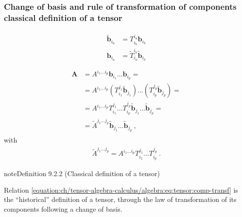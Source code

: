 \documentclass[letterpaper,10pt,english]{jupyterBook}
\begin{document}
\subsubsection{Change of basis and rule of transformation of components \sphinxhyphen{} classical definition of a tensor}
\label{\detokenize{ch/tensor-algebra-calculus/algebra:change-of-basis-and-rule-of-transformation-of-components-classical-definition-of-a-tensor}}\begin{equation*}
\begin{split}\begin{aligned}
  \widetilde{\mathbf{b}}_{i_a} & = T_{i_b}^{i_a} \mathbf{b}_{i_b} \\
             \mathbf{b }_{i_a} & = \widetilde{T}_{i_a}^{i_b} \widetilde{\mathbf{b}}_{i_b} \\
\end{aligned}\end{split}
\end{equation*}\begin{equation*}
\begin{split}\begin{aligned}
  \mathbf{A}
  & = A^{i_1 \dots i_p} \mathbf{b}_{i_1} \dots \mathbf{b}_{i_p} = \\
  & = A^{i_1 \dots i_p} \left( T_{i_1}^{j_1} \widetilde{\mathbf{b}}_{j_1} \right) \dots \left( T_{i_p}^{j_p} \widetilde{\mathbf{b}}_{j_p} \right) = \\
  & = A^{i_1 \dots i_p} T_{i_1}^{j_1} \dots  T_{i_p}^{j_p} \widetilde{\mathbf{b}}_{j_1} \dots \widetilde{\mathbf{b}}_{j_p} = \\
  & = \widetilde{A}^{j_1 \dots j_p} \widetilde{\mathbf{b}}_{j_1} \dots \widetilde{\mathbf{b}}_{j_p} \ ,
\end{aligned}\end{split}
\end{equation*}
\sphinxAtStartPar
with
\begin{equation}\label{equation:ch/tensor-algebra-calculus/algebra:eq:tensor:comp-transf}
\begin{split}\widetilde{A}^{j_1 \dots j_p} = A^{i_1 \dots i_p} T_{i_1}^{j_1} \dots  T_{i_p}^{j_p} \ .\end{split}
\end{equation}\label{ch/tensor-algebra-calculus/algebra:definition-8}
\begin{sphinxadmonition}{note}{Definition 9.2.2 (Classical definition of a tensor)}



\sphinxAtStartPar
Relation \eqref{equation:ch/tensor-algebra-calculus/algebra:eq:tensor:comp-transf} is the “historical” definition of a tensor, through the law of transformation of its components following a change of basis.
\end{sphinxadmonition}
\end{document}
